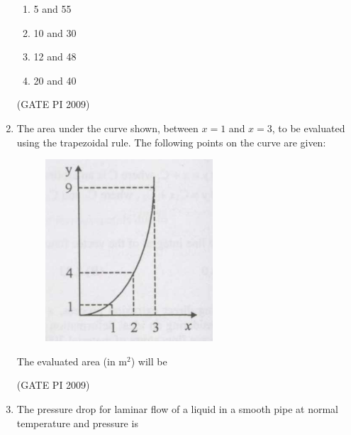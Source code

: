 \documentclass[journal,12pt,onecolumn]{IEEEtran}
\theoremstyle{remark}
\begin{document}
\begin{enumerate}[label=Q.\arabic*]
\begin{enumerate}
\item 5 and 55
\item 10 and 30 
\item 12 and 48
\item 20 and 40
\end{enumerate}
\hfill (GATE PI 2009)
\item The area under the curve shown, between $x=1$ and $x=3$, to be evaluated using the trapezoidal rule. The following points on the curve are given:
\begin{figure}[h]
    \centering
    \includegraphics[width=0.3\linewidth]{figs/3.png}
    \label{fig:placeholder}
\end{figure} 
\begin{center}

\end{center}
The evaluated area (in m$^2$) will be
\begin{enumerate}
\end{enumerate}
\hfill (GATE PI 2009)
\item The pressure drop for laminar flow of a liquid in a smooth pipe at normal temperature and pressure is
\begin{enumerate}
\end{enumerate}
\end{enumerate}
\end{document}
